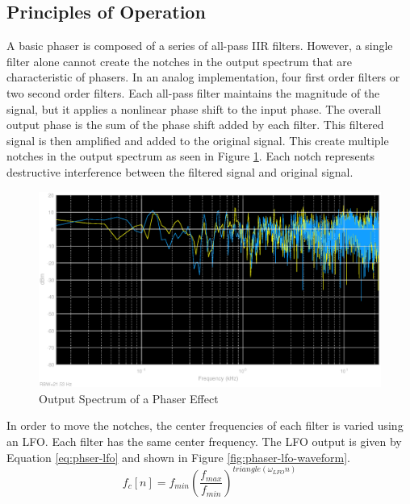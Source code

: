 \subsection{Principles of Operation}
A basic phaser is composed of a series of all-pass IIR filters. However, a single filter alone cannot create the notches in the output spectrum that are characteristic of phasers. In an analog implementation, four first order filters or two second order filters. Each all-pass filter maintains the magnitude of the signal, but it applies a nonlinear phase shift to the input phase. The overall output phase is the sum of the phase shift added by each filter. This filtered signal is then amplified and added to the original signal. This create multiple notches in the output spectrum as seen in Figure \ref{fig:phaser-spectrum}. Each notch represents destructive interference between the filtered signal and original signal.
\begin{figure}[ht]
    \centering
    \includegraphics[scale=0.5]{phaser-spectrum.eps}
    \caption{Output Spectrum of a Phaser Effect}
    \label{fig:phaser-spectrum}
\end{figure}
In order to move the notches, the center frequencies of each filter is varied using an LFO. Each filter has the same center frequency. The LFO output is given by Equation \ref{eq:phser-lfo} and shown in Figure \ref{fig:phaser-lfo-waveform}.
\begin{equation}
    f_c[n] = f_{min}\left(\frac{f_{max}}{f_{min}}\right)^{triangle(\omega_{LFO} n)}
    \label{eq:phser-lfo}
\end{equation}
